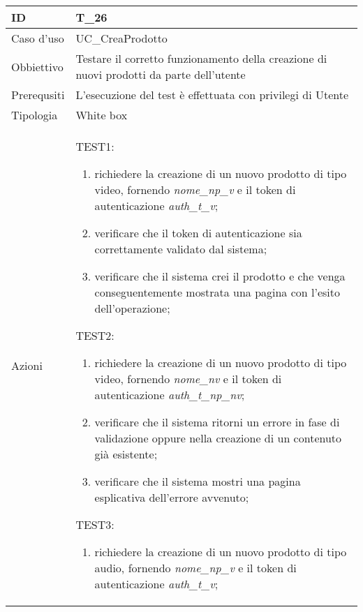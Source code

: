 \begin{table}[hb]
    \centering
    \begin{tabular}{ |p{2cm}|p{10cm}|  }
        \hline
        ID          & T\_26                                                                      \\\hline
        Caso d'uso  & UC\_CreaProdotto                                                      \\\hline
        Obbiettivo  & Testare il corretto funzionamento della creazione di nuovi prodotti da parte dell'utente  \\\hline
        Prerequsiti & L'esecuzione del test è effettuata con privilegi di Utente                 \\\hline
        Tipologia   & White box                                                                  \\\hline
        Azioni      &
        TEST1:
        \begin{enumerate}[nosep, topsep=0pt]
            \item richiedere la creazione di un nuovo prodotto di tipo video, fornendo \emph{nome\_np\_v} e il token di autenticazione \emph{auth\_t\_v};
            \item verificare che il token di autenticazione sia correttamente validato dal sistema;
            \item verificare che il sistema crei il prodotto e che venga conseguentemente mostrata una pagina con l'esito dell'operazione;
        \end{enumerate}
        \vspace{0.5cm} TEST2:
        \begin{enumerate}[nosep, topsep=0pt]
            \item richiedere la creazione di un nuovo prodotto di tipo video, fornendo \emph{nome\_nv} e il token di autenticazione \emph{auth\_t\_np\_nv};
            \item verificare che il sistema ritorni un errore in fase di validazione oppure nella creazione di un contenuto già esistente;
            \item verificare che il sistema mostri una pagina esplicativa dell'errore avvenuto;
        \end{enumerate}
        \vspace{0.5cm}
        TEST3:
        \begin{enumerate}[nosep, topsep=0pt]
            \item richiedere la creazione di un nuovo prodotto di tipo audio, fornendo \emph{nome\_np\_v} e il token di autenticazione \emph{auth\_t\_v};

\end{enumerate}
\end{tabular}
\end{table}
